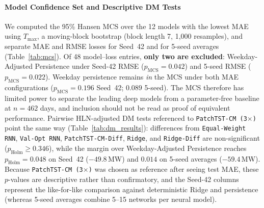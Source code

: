 \documentclass[5p,twocolumn,authoryear]{elsarticle}
\begin{document}
\paragraph{Model Confidence Set and Descriptive DM Tests}
We computed the 95\% Hansen MCS over the 12 models with the lowest MAE using $T_{\max}$, a moving-block bootstrap (block length 7, 1,000 resamples), and separate MAE and RMSE losses for Seed~42 and for 5-seed averages (Table~\ref{tab:mcs}). Of 48 model--loss entries, \textbf{only two are excluded}: Weekday-Adjusted Persistence under Seed-42 RMSE ($p_{\text{MCS}} = 0.042$) and 5-seed RMSE ($p_{\text{MCS}} = 0.022$). Weekday persistence remains \textit{in} the MCS under both MAE configurations ($p_{\text{MCS}} = 0.196$ Seed~42; $0.089$ 5-seed). The MCS therefore has limited power to separate the leading deep models from a parameter-free baseline at $n=462$ days, and inclusion should not be read as proof of equivalent performance. Pairwise HLN-adjusted DM tests referenced to \texttt{PatchTST-CM (3$\times$)} point the same way (Table~\ref{tab:dm_results}): differences from \texttt{Equal-Weight RNN}, \texttt{Val-Opt RNN}, \texttt{PatchTST-CM-Diff}, \texttt{Ridge}, and \texttt{Ridge-Diff} are non-significant ($p_{\text{Holm}} \ge 0.346$), while the margin over Weekday-Adjusted Persistence reaches $p_{\text{Holm}} = 0.048$ on Seed~42 ($-49.8$\,MW) and $0.014$ on 5-seed averages ($-59.4$\,MW). Because \texttt{PatchTST-CM (3$\times$)} was chosen as reference after seeing test MAE, these $p$-values are descriptive rather than confirmatory, and the Seed-42 columns represent the like-for-like comparison against deterministic Ridge and persistence (whereas 5-seed averages combine 5--15 networks per neural model).
\end{document}
